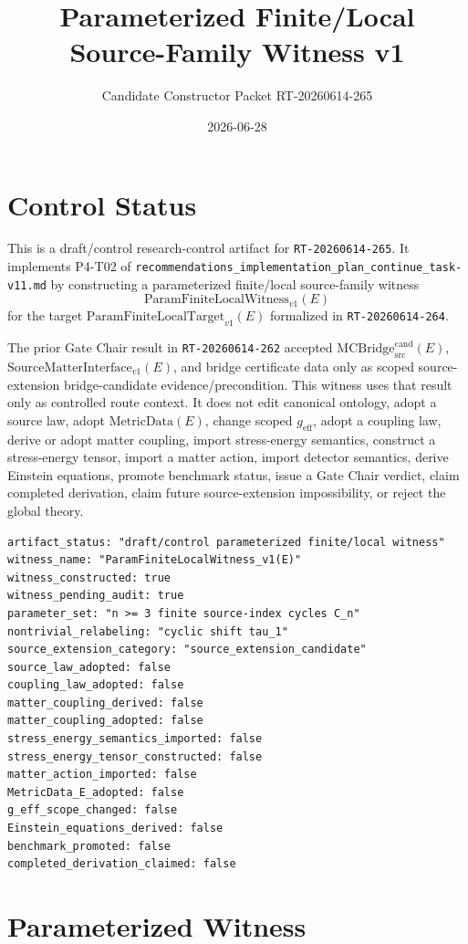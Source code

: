 \documentclass[11pt]{article}
\title{Parameterized Finite/Local Source-Family Witness v1}
\author{Candidate Constructor Packet RT-20260614-265}
\date{2026-06-28}
\newcommand{\MetricData}{\mathrm{MetricData}}
\newcommand{\geff}{g_{\mathrm{eff}}}
\newcommand{\MCBridgeCand}{\mathrm{MCBridge}_{\mathrm{src}}^{\mathrm{cand}}}
\newcommand{\SMI}{\mathrm{SourceMatterInterface}_{v1}}
\newcommand{\PFLFT}{\mathrm{ParamFiniteLocalTarget}_{v1}}
\newcommand{\PFLFW}{\mathrm{ParamFiniteLocalWitness}_{v1}}
\begin{document}
\maketitle

\section{Control Status}

This is a draft/control research-control artifact for
\texttt{RT-20260614-265}. It implements P4-T02 of
\texttt{recommendations\_implementation\_plan\_continue\_task-v11.md} by
constructing a parameterized finite/local source-family witness
\[
  \PFLFW(E)
\]
for the target \(\PFLFT(E)\) formalized in \texttt{RT-20260614-264}.

The prior Gate Chair result in \texttt{RT-20260614-262} accepted
\(\MCBridgeCand(E)\), \(\SMI(E)\), and bridge certificate data only as scoped
source-extension bridge-candidate evidence/precondition. This witness uses
that result only as controlled route context. It does not edit canonical
ontology, adopt a source law, adopt \(\MetricData(E)\), change scoped
\(\geff\), adopt a coupling law, derive or adopt matter coupling, import
stress-energy semantics, construct a stress-energy tensor, import a matter
action, import detector semantics, derive Einstein equations, promote
benchmark status, issue a Gate Chair verdict, claim completed derivation,
claim future source-extension impossibility, or reject the global theory.

\begin{verbatim}
artifact_status: "draft/control parameterized finite/local witness"
witness_name: "ParamFiniteLocalWitness_v1(E)"
witness_constructed: true
witness_pending_audit: true
parameter_set: "n >= 3 finite source-index cycles C_n"
nontrivial_relabeling: "cyclic shift tau_1"
source_extension_category: "source_extension_candidate"
source_law_adopted: false
coupling_law_adopted: false
matter_coupling_derived: false
matter_coupling_adopted: false
stress_energy_semantics_imported: false
stress_energy_tensor_constructed: false
matter_action_imported: false
MetricData_E_adopted: false
g_eff_scope_changed: false
Einstein_equations_derived: false
benchmark_promoted: false
completed_derivation_claimed: false
\end{verbatim}

\section{Parameterized Witness}
\end{document}

